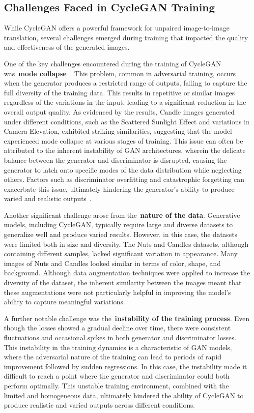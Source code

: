 \documentclass[12pt,DIV14,BCOR12mm,a4paper,footinclude=false,headinclude,parskip=half-,twoside,openright,cleardoublepage=empty,toc=index,bibliography=totoc,listof=totoc]{scrreprt}
\numberwithin{equation}{chapter}
\begin{document}
\subsection{Challenges Faced in CycleGAN Training}

While CycleGAN offers a powerful framework for unpaired image-to-image translation, several challenges emerged during training that impacted the quality and effectiveness of the generated images.

One of the key challenges encountered during the training of CycleGAN was~\textbf{mode collapse}~\cite{kodali2017convergence}. This problem, common in adversarial training, occurs when the generator produces a restricted range of outputs, failing to capture the full diversity of the training data. This results in repetitive or similar images regardless of the variations in the input, leading to a significant reduction in the overall output quality. As evidenced by the results, Candle images generated under different conditions, such as the Scattered Sunlight Effect and variations in Camera Elevation, exhibited striking similarities, suggesting that the model experienced mode collapse at various stages of training. This issue can often be attributed to the inherent instability of GAN architectures, wherein the delicate balance between the generator and discriminator is disrupted, causing the generator to latch onto specific modes of the data distribution while neglecting others. Factors such as discriminator overfitting and catastrophic forgetting can exacerbate this issue, ultimately hindering the generator's ability to produce varied and realistic outputs~\cite{modecollapse}.

Another significant challenge arose from the~\textbf{nature of the data}. Generative models, including CycleGAN, typically require large and diverse datasets to generalize well and produce varied results. However, in this case, the datasets were limited both in size and diversity. The Nuts and Candles datasets, although containing different samples, lacked significant variation in appearance. Many images of Nuts and Candles looked similar in terms of color, shape, and background. Although data augmentation techniques were applied to increase the diversity of the dataset, the inherent similarity between the images meant that these augmentations were not particularly helpful in improving the model’s ability to capture meaningful variations.

A further notable challenge was the~\textbf{instability of the training process}. Even though the losses showed a gradual decline over time, there were consistent fluctuations and occasional spikes in both generator and discriminator losses. This instability in the training dynamics is a characteristic of GAN models, where the adversarial nature of the training can lead to periods of rapid improvement followed by sudden regressions. In this case, the instability made it difficult to reach a point where the generator and discriminator could both perform optimally. This unstable training environment, combined with the limited and homogeneous data, ultimately hindered the ability of CycleGAN to produce realistic and varied outputs across different conditions.
\end{document}

